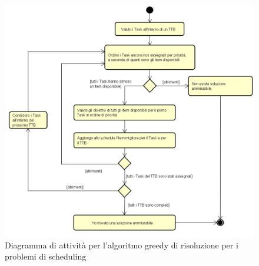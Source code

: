 \begin{figure}[!h]
    \begin{widepage}
        \includegraphics[width=14.9cm,keepaspectratio]{../immagini/algoritmo.png}
        \caption{Diagramma di attività per l'algoritmo greedy di risoluzione per i problemi di scheduling}
    \end{widepage}
\end{figure}
